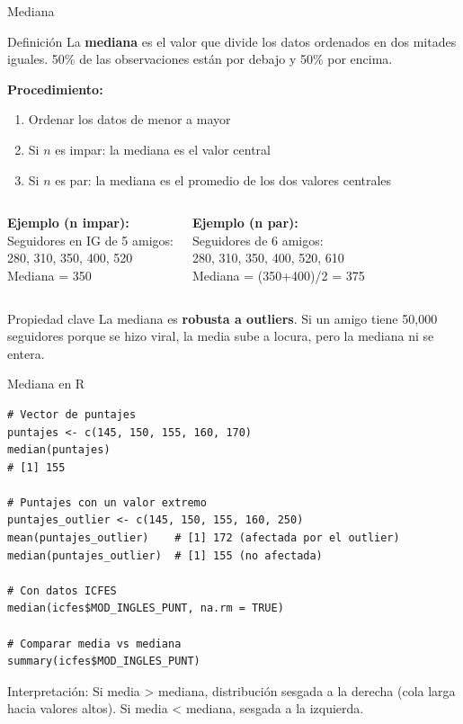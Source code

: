 \documentclass[aspectratio=169, 11pt]{beamer}
\begin{document}
\begin{frame}{Mediana}
\begin{block}{Definición}
La \textbf{mediana} es el valor que divide los datos ordenados en dos mitades iguales. 50\% de las observaciones están por debajo y 50\% por encima.
\end{block}

\textbf{Procedimiento:}
\begin{enumerate}
\item Ordenar los datos de menor a mayor
\item Si $n$ es impar: la mediana es el valor central
\item Si $n$ es par: la mediana es el promedio de los dos valores centrales
\end{enumerate}

\begin{columns}[T]
\textbf{Ejemplo (n impar):}\\
\footnotesize
Seguidores en IG de 5 amigos:\\
280, 310, \alert{350}, 400, 520\\
Mediana = 350

\textbf{Ejemplo (n par):}\\
\footnotesize
Seguidores de 6 amigos:\\
280, 310, \alert{350, 400}, 520, 610\\
Mediana = (350+400)/2 = 375
\end{columns}

\begin{alertblock}{Propiedad clave}
\small La mediana es \textbf{robusta a outliers}. Si un amigo tiene 50{,}000 seguidores porque se hizo viral, la media sube a locura, pero la mediana ni se entera.
\end{alertblock}
\end{frame}

\begin{frame}[fragile]{Mediana en R}
\begin{lstlisting}
# Vector de puntajes
puntajes <- c(145, 150, 155, 160, 170)
median(puntajes)
# [1] 155

# Puntajes con un valor extremo
puntajes_outlier <- c(145, 150, 155, 160, 250)
mean(puntajes_outlier)    # [1] 172 (afectada por el outlier)
median(puntajes_outlier)  # [1] 155 (no afectada)

# Con datos ICFES
median(icfes$MOD_INGLES_PUNT, na.rm = TRUE)

# Comparar media vs mediana
summary(icfes$MOD_INGLES_PUNT)
\end{lstlisting}

\vspace{0.5em}
\alert{Interpretación}: Si media > mediana, distribución sesgada a la derecha (cola larga hacia valores altos). Si media < mediana, sesgada a la izquierda.
\end{frame}
\end{document}
